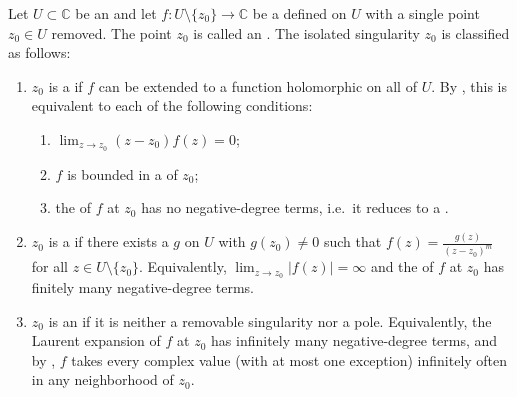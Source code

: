 \begin{definition} \label{definition:isolated_singularity_of_a_holomorphic_function_from_an_open_subset_of_the_complex_plane_to_the_complex_plane_classified_as_removable_pole_or_essential}
Let $U \subset \mathbb{C}$ be an  and let $f : U \setminus \{z_0\} \to \mathbb{C}$ be a  defined on $U$ with a single point $z_0 \in U$ removed. The point $z_0$ is called an . The isolated singularity $z_0$ is classified as follows:
\begin{enumerate}
  \item $z_0$ is a  if $f$ can be extended to a function holomorphic on all of $U$. By , this is equivalent to each of the following conditions:
  \begin{enumerate}
      \item $\lim_{z \to z_0} (z - z_0)f(z) = 0$;
      \item $f$ is bounded in a  of $z_0$;
      \item the  of $f$ at $z_0$ has no negative-degree terms, i.e.\ it reduces to a .
  \end{enumerate}

  \item $z_0$ is a  if there exists a  $g$ on $U$ with $g(z_0) \neq 0$ such that $f(z) = \frac{g(z)}{(z - z_0)^m}$ for all $z \in U \setminus \{z_0\}$. Equivalently, $\lim_{z \to z_0} |f(z)| = \infty$ and the  of $f$ at $z_0$ has finitely many negative-degree terms.
  \item $z_0$ is an  if it is neither a removable singularity nor a pole. Equivalently, the Laurent expansion of $f$ at $z_0$ has infinitely many negative-degree terms, and by , $f$ takes every complex value (with at most one exception) infinitely often in any neighborhood of $z_0$.
\end{enumerate}
\end{definition}
